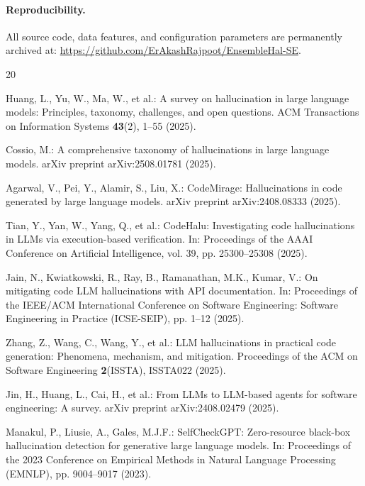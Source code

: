 \documentclass{svproc}
\begin{document}
\paragraph{Reproducibility.} All source code, data features, and configuration parameters are permanently archived at: \url{https://github.com/ErAkashRajpoot/EnsembleHal-SE}.

\begin{thebibliography}{20}

Huang, L., Yu, W., Ma, W., et al.: A survey on hallucination in large language models: Principles, taxonomy, challenges, and open questions. ACM Transactions on Information Systems \textbf{43}(2), 1--55 (2025).

Cossio, M.: A comprehensive taxonomy of hallucinations in large language models. arXiv preprint arXiv:2508.01781 (2025).

Agarwal, V., Pei, Y., Alamir, S., Liu, X.: CodeMirage: Hallucinations in code generated by large language models. arXiv preprint arXiv:2408.08333 (2025).

Tian, Y., Yan, W., Yang, Q., et al.: CodeHalu: Investigating code hallucinations in LLMs via execution-based verification. In: Proceedings of the AAAI Conference on Artificial Intelligence, vol. 39, pp. 25300--25308 (2025).

Jain, N., Kwiatkowski, R., Ray, B., Ramanathan, M.K., Kumar, V.: On mitigating code LLM hallucinations with API documentation. In: Proceedings of the IEEE/ACM International Conference on Software Engineering: Software Engineering in Practice (ICSE-SEIP), pp. 1--12 (2025).

Zhang, Z., Wang, C., Wang, Y., et al.: LLM hallucinations in practical code generation: Phenomena, mechanism, and mitigation. Proceedings of the ACM on Software Engineering \textbf{2}(ISSTA), ISSTA022 (2025).

Jin, H., Huang, L., Cai, H., et al.: From LLMs to LLM-based agents for software engineering: A survey. arXiv preprint arXiv:2408.02479 (2025).

Manakul, P., Liusie, A., Gales, M.J.F.: SelfCheckGPT: Zero-resource black-box hallucination detection for generative large language models. In: Proceedings of the 2023 Conference on Empirical Methods in Natural Language Processing (EMNLP), pp. 9004--9017 (2023).


\end{thebibliography}
\end{document}
